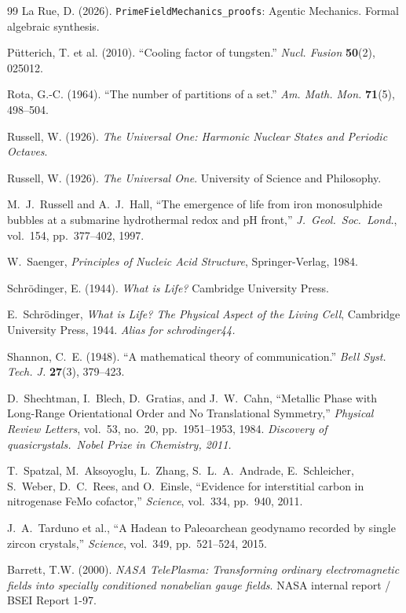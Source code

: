 \documentclass[12pt,oneside]{book}
\theoremstyle{principia}
\theoremstyle{definition}
\theoremstyle{remark}
\begin{document}
\begin{thebibliography}{99}
La Rue, D. (2026).
\texttt{PrimeFieldMechanics\_proofs}: Agentic Mechanics.
Formal algebraic synthesis.

P\"utterich, T. et al. (2010).
``Cooling factor of tungsten.''
\textit{Nucl. Fusion} \textbf{50}(2), 025012.

Rota, G.-C. (1964).
``The number of partitions of a set.''
\textit{Am. Math. Mon.} \textbf{71}(5), 498--504.

Russell, W. (1926).
\textit{The Universal One: Harmonic Nuclear States and Periodic Octaves}.

Russell, W. (1926).
\textit{The Universal One}. University of Science and Philosophy.

M.~J.~Russell and A.~J.~Hall,
``The emergence of life from iron monosulphide bubbles at a submarine hydrothermal
redox and pH front,''
\emph{J.\ Geol.\ Soc.\ Lond.}, vol.~154, pp.~377--402, 1997.

W.~Saenger,
\emph{Principles of Nucleic Acid Structure},
Springer-Verlag, 1984.

Schr\"odinger, E. (1944).
\textit{What is Life?} Cambridge University Press.

E.~Schr\"odinger,
\emph{What is Life? The Physical Aspect of the Living Cell},
Cambridge University Press, 1944.
\textit{Alias for schrodinger44.}

Shannon, C.~E. (1948).
``A mathematical theory of communication.''
\textit{Bell Syst. Tech. J.} \textbf{27}(3), 379--423.

D.~Shechtman, I.~Blech, D.~Gratias, and J.~W.~Cahn,
``Metallic Phase with Long-Range Orientational Order and No Translational Symmetry,''
\emph{Physical Review Letters}, vol.~53, no.~20, pp.~1951--1953, 1984.
\textit{Discovery of quasicrystals.\ Nobel Prize in Chemistry, 2011.}

T.~Spatzal, M.~Aksoyoglu, L.~Zhang, S.~L.~A.~Andrade, E.~Schleicher, S.~Weber,
D.~C.~Rees, and O.~Einsle,
``Evidence for interstitial carbon in nitrogenase FeMo cofactor,''
\emph{Science}, vol.~334, pp.~940, 2011.

J.~A.~Tarduno et al.,
``A Hadean to Paleoarchean geodynamo recorded by single zircon crystals,''
\emph{Science}, vol.~349, pp.~521--524, 2015.

Barrett, T.W. (2000).
\textit{NASA TelePlasma: Transforming ordinary electromagnetic fields into specially conditioned nonabelian gauge fields}.
NASA internal report / BSEI Report 1-97.


\end{thebibliography}
\end{document}
